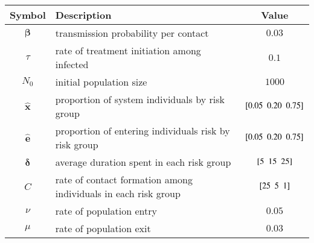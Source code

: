 \begin{tabular}{clc}
	\toprule
	    Symbol     & Description                                                     &            Value             \\
	\midrule
	 $\bm{\beta}$  & transmission probability per contact                            &            $0.03$            \\
	    $\tau$     & rate of treatment initiation among infected                     &            $0.1$             \\
	    $N_0$      & initial population size                                         &            $1000$            \\
	\midrule
	$\bm{\hat{x}}$ & proportion of system individuals by risk group                  & $[ 0.05 \enspace 0.20 \enspace 0.75 ]$ \\
	$\bm{\hat{e}}$ & proportion of entering individuals risk by risk group           & $[ 0.05 \enspace 0.20 \enspace 0.75 ]$ \\
	$\bm{\delta}$  & average duration spent in each risk group                       &    $[ 5 \enspace 15 \enspace 25 ]$     \\
	     $C$       & rate of contact formation among individuals in each risk group  &     $[ 25 \enspace 5 \enspace 1 ]$     \\
	    $\nu$      & rate of population entry                                        &            $0.05$            \\
	    $\mu$      & rate of population exit                                         &            $0.03$            \\
	\bottomrule
\end{tabular}